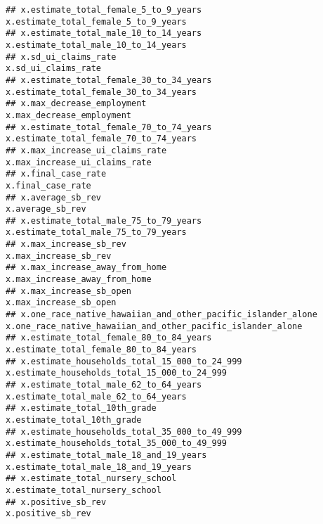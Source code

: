 \documentclass[
]{article}
\begin{document}
\begin{verbatim}
## x.estimate_total_female_5_to_9_years                                               x.estimate_total_female_5_to_9_years
## x.estimate_total_male_10_to_14_years                                               x.estimate_total_male_10_to_14_years
## x.sd_ui_claims_rate                                                                                 x.sd_ui_claims_rate
## x.estimate_total_female_30_to_34_years                                           x.estimate_total_female_30_to_34_years
## x.max_decrease_employment                                                                     x.max_decrease_employment
## x.estimate_total_female_70_to_74_years                                           x.estimate_total_female_70_to_74_years
## x.max_increase_ui_claims_rate                                                             x.max_increase_ui_claims_rate
## x.final_case_rate                                                                                     x.final_case_rate
## x.average_sb_rev                                                                                       x.average_sb_rev
## x.estimate_total_male_75_to_79_years                                               x.estimate_total_male_75_to_79_years
## x.max_increase_sb_rev                                                                             x.max_increase_sb_rev
## x.max_increase_away_from_home                                                             x.max_increase_away_from_home
## x.max_increase_sb_open                                                                           x.max_increase_sb_open
## x.one_race_native_hawaiian_and_other_pacific_islander_alone x.one_race_native_hawaiian_and_other_pacific_islander_alone
## x.estimate_total_female_80_to_84_years                                           x.estimate_total_female_80_to_84_years
## x.estimate_households_total_15_000_to_24_999                               x.estimate_households_total_15_000_to_24_999
## x.estimate_total_male_62_to_64_years                                               x.estimate_total_male_62_to_64_years
## x.estimate_total_10th_grade                                                                 x.estimate_total_10th_grade
## x.estimate_households_total_35_000_to_49_999                               x.estimate_households_total_35_000_to_49_999
## x.estimate_total_male_18_and_19_years                                             x.estimate_total_male_18_and_19_years
## x.estimate_total_nursery_school                                                         x.estimate_total_nursery_school
## x.positive_sb_rev                                                                                     x.positive_sb_rev

\end{verbatim}
\end{document}
